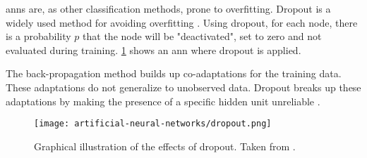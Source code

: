 \glspl{ann} are, as other classification methods, prone to overfitting. Dropout is a widely used method for avoiding overfitting \citep{bib:srivastava2014dropout}. Using dropout, for each node, there is a probability $p$ that the node will be "deactivated", set to zero and not evaluated during training. \cref{fig:network-dropout} shows an \gls{ann} where dropout is applied.

The back-propagation method builds up co-adaptations for the training data. These adaptations do not generalize to unobserved data. Dropout breaks up these adaptations by making the presence of a specific hidden unit unreliable \citep{bib:srivastava2014dropout}.

\begin{figure}
    \centering
    \texttt{[image: artificial-neural-networks/dropout.png]}
    \caption{Graphical illustration of the effects of dropout. Taken from \citet{bib:srivastava2014dropout}.}
    \label{fig:network-dropout}
\end{figure}